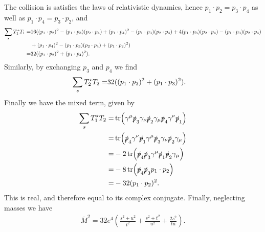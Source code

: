 The collision is satisfies the laws of relativistic dynamics, hence $p_{1}\cdot p_{2} = p_{3}\cdot p_{4}$ as well as $p_{1}\cdot p_{4} = p_{3}\cdot p_{2}$, and
\begin{align*}
	\sum\limits_{s}T_{1}^{\star} T_{1} =& 16((p_{1}\cdot p_{2})^{2} - (p_{1}\cdot p_{3})(p_{2}\cdot p_{4}) + (p_{1}\cdot p_{4})^{2} - (p_{1}\cdot p_{3})(p_{2}\cdot p_{4}) + 4(p_{1}\cdot p_{3})(p_{2}\cdot p_{4}) - (p_{1}\cdot p_{3})(p_{2}\cdot p_{4}) \\
	                               &+ (p_{1}\cdot p_{4})^{2} - (p_{1}\cdot p_{3})(p_{2}\cdot p_{4}) + (p_{1}\cdot p_{2})^{2}) \\
	                              =& 32((p_{1}\cdot p_{2})^{2} + (p_{1}\cdot p_{4})^{2}).
\end{align*}
Similarly, by exchanging $p_{3}$ and $p_{4}$ we find
\begin{align*}
	\sum\limits_{s}T_{2}^{\star} T_{2} =& 32((p_{1}\cdot p_{2})^{2} + (p_{1}\cdot p_{3})^{2}).
\end{align*}
Finally we have the mixed term, given by
\begin{align*}
	\sum\limits_{s}T_{1}^{\star} T_{2} =& \tr(\gamma^{\mu}\slashed{p}_{3}\gamma_{\nu}\slashed{p}_{2}\gamma_{\mu}\slashed{p}_{4}\gamma^{\nu}\slashed{p}_{1}) \\
	=& \tr(\slashed{p}_{4}\gamma^{\nu}\slashed{p}_{1}\gamma^{\mu}\slashed{p}_{3}\gamma_{\nu}\slashed{p}_{2}\gamma_{\mu}) \\
	=& -2\tr(\slashed{p}_{4}\slashed{p}_{3}\gamma^{\mu}\slashed{p}_{1}\slashed{p}_{2}\gamma_{\mu}) \\
	=& -8\tr(\slashed{p}_{4}\slashed{p}_{3}p_{1}\cdot p_{2}) \\
	=& -32(p_{1}\cdot p_{2})^{2}.
\end{align*}
This is real, and therefore equal to its complex conjugate. Finally, neglecting masses we have
\begin{align*}
	\overline{M}^{2} = 32e^{4}\left(\frac{s^{2} + u^{2}}{t^{2}} + \frac{s^{2} + t^{2}}{u^{2}} + \frac{2s^{2}}{tu}\right).
\end{align*}